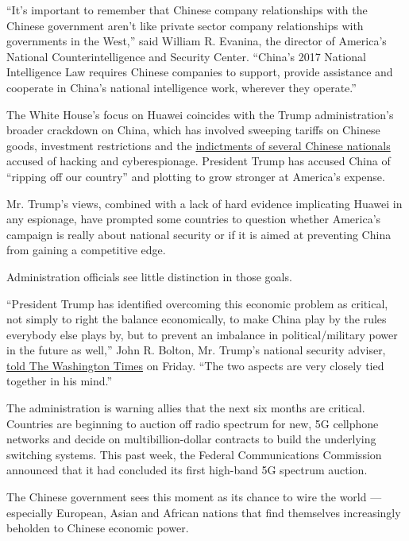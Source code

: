 ``It's important to remember that Chinese company relationships with the
Chinese government aren't like private sector company relationships with
governments in the West,'' said William R. Evanina, the director of
America's National Counterintelligence and Security Center. ``China's
2017 National Intelligence Law requires Chinese companies to support,
provide assistance and cooperate in China's national intelligence work,
wherever they operate.''

The White House's focus on Huawei coincides with the Trump
administration's broader crackdown on China, which has involved sweeping
tariffs on Chinese goods, investment restrictions and the
\href{https://www.nytimes.com/2018/10/30/us/politics/justice-department-china-espionage.html}{indictments
of several Chinese nationals} accused of hacking and cyberespionage.
President Trump has accused China of ``ripping off our country'' and
plotting to grow stronger at America's expense.

Mr. Trump's views, combined with a lack of hard evidence implicating
Huawei in any espionage, have prompted some countries to question
whether America's campaign is really about national security or if it is
aimed at preventing China from gaining a competitive edge.

Administration officials see little distinction in those goals.

``President Trump has identified overcoming this economic problem as
critical, not simply to right the balance economically, to make China
play by the rules everybody else plays by, but to prevent an imbalance
in political/military power in the future as well,'' John R. Bolton, Mr.
Trump's national security adviser,
\href{https://www.washingtontimes.com/news/2019/jan/25/john-bolton-explains-trumps-strategy-on-north-kore/}{told
The Washington Times} on Friday. ``The two aspects are very closely tied
together in his mind.''

The administration is warning allies that the next six months are
critical. Countries are beginning to auction off radio spectrum for new,
5G cellphone networks and decide on multibillion-dollar contracts to
build the underlying switching systems. This past week, the Federal
Communications Commission announced that it had concluded its first
high-band 5G spectrum auction.

The Chinese government sees this moment as its chance to wire the world
--- especially European, Asian and African nations that find themselves
increasingly beholden to Chinese economic power.

